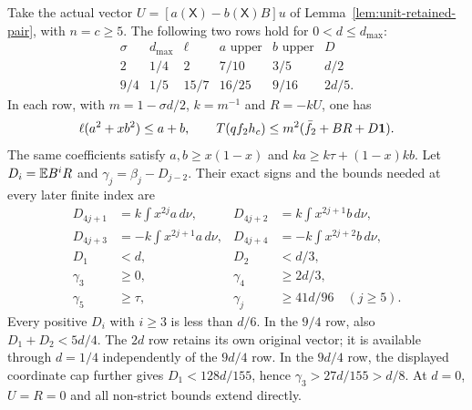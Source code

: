 \begin{lemma}
\label{lem:reference-retained-packet}
Take the actual vector $U=[a(\mathsf X)-b(\mathsf X)B]u$ of
Lemma~\ref{lem:unit-retained-pair}, with $n=c\ge5$. The following
two rows hold for $0<d\le d_{\max}$:
\[
\begin{array}{c|c|c|c|c|c}
 \sigma&d_{\max}&\ell&a\text{ upper}&b\text{ upper}&D\\\hline
 2&1/4&2&7/10&3/5&d/2\\
 9/4&1/5&15/7&16/25&9/16&2d/5.
\end{array}
\]
In each row, with $m=1-\sigma d/2$, $k=m^{-1}$ and $R=-kU$, one has
\begin{equation}\label{eq:reference-retained:coefficient}
 \ell(a^2+xb^2)\le a+b,\qquad
 T(qf_2h_c)\le m^2(\bar f_2+BR+D\mathbf1).
\end{equation}
The same coefficients satisfy $a,b\ge x(1-x)$ and
$ka\ge k\tau+(1-x)kb$.
Let $D_i=\mathbb E B^iR$ and $\gamma_j=\beta_j-D_{j-2}$. Their exact signs and
the bounds needed at every later finite index are
\begin{equation}\label{eq:reference-retained:signed-moments}
\begin{aligned}
 D_{4j+1}&=k\int x^{2j}a\,d\nu,&
 D_{4j+2}&=k\int x^{2j+1}b\,d\nu,\\
 D_{4j+3}&=-k\int x^{2j+1}a\,d\nu,&
 D_{4j+4}&=-k\int x^{2j+2}b\,d\nu,\\
 D_1&<d,&D_2&<d/3,\\
 \gamma_3&\ge0,&\gamma_4&\ge2d/3,\\
 \gamma_5&\ge\tau,&\gamma_j&\ge41d/96\quad(j\ge5).
\end{aligned}
\end{equation}
Every positive $D_i$ with $i\ge3$ is less than $d/6$. In the $9/4$ row,
also $D_1+D_2<5d/4$. The $2d$ row retains its own original vector;
it is available through $d=1/4$ independently of the $9d/4$ row.
In the $9d/4$ row, the displayed coordinate cap further gives
$D_1<128d/155$, hence $\gamma_3>27d/155>d/8$.
At $d=0$, $U=R=0$ and all non-strict bounds extend directly.
\end{lemma}
